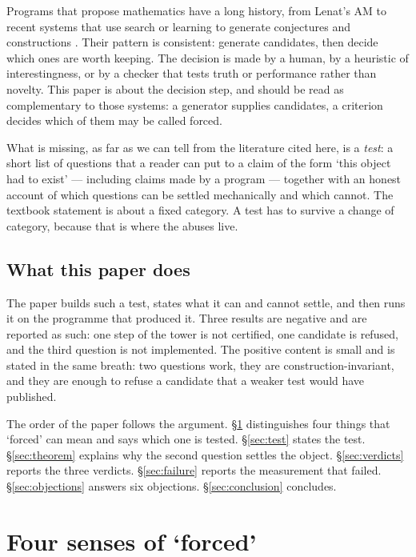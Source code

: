 \documentclass[12pt,a4paper]{article}
\begin{document}
Programs that propose mathematics have a long history, from Lenat's \textsc{AM}
\citep{lenat1976} to recent systems that use search or learning to generate
conjectures and constructions \citep{davies2021,raayoni2021,romera2024}.  Their
pattern is consistent: generate candidates, then decide which ones are worth
keeping.  The decision is made by a human, by a heuristic of interestingness, or by
a checker that tests truth or performance rather than novelty.  This paper is about
the decision step, and should be read as complementary to those systems: a
generator supplies candidates, a criterion decides which of them may be called
forced.

What is missing, as far as we can tell from the literature cited here, is a
\emph{test}: a short list of questions that a reader can put to a claim of the
form `this object had to exist' --- including claims made by a program ---
together with an honest account of which questions can be settled mechanically
and which cannot.  The textbook statement is about a fixed category.  A test has
to survive a change of category, because that is where the abuses live.

\subsection{What this paper does}

The paper builds such a test, states what it can and cannot settle, and then runs
it on the programme that produced it.  Three results are negative and are
reported as such: one step of the tower is not certified, one candidate is
refused, and the third question is not implemented.  The positive content is
small and is stated in the same breath: two questions work, they are
construction-invariant, and they are enough to refuse a candidate that a weaker
test would have published.

The order of the paper follows the argument.  \S\ref{sec:senses} distinguishes
four things that `forced' can mean and says which one is tested.
\S\ref{sec:test} states the test.  \S\ref{sec:theorem} explains why the second
question settles the object.  \S\ref{sec:verdicts} reports the three verdicts.
\S\ref{sec:failure} reports the measurement that failed.
\S\ref{sec:objections} answers six objections.  \S\ref{sec:conclusion} concludes.

\section{Four senses of `forced'}
\label{sec:senses}
\end{document}
